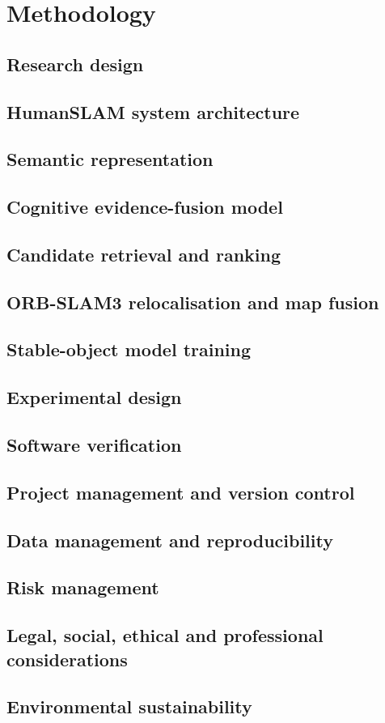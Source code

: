 \chapter{Methodology}
\label{chap:methodology}

\section{Research design}

\section{HumanSLAM system architecture}

\section{Semantic representation}

\section{Cognitive evidence-fusion model}

\section{Candidate retrieval and ranking}

\section{ORB-SLAM3 relocalisation and map fusion}

\section{Stable-object model training}

\section{Experimental design}

\section{Software verification}

\section{Project management and version control}

\section{Data management and reproducibility}

\section{Risk management}

\section{Legal, social, ethical and professional considerations}

\section{Environmental sustainability}
